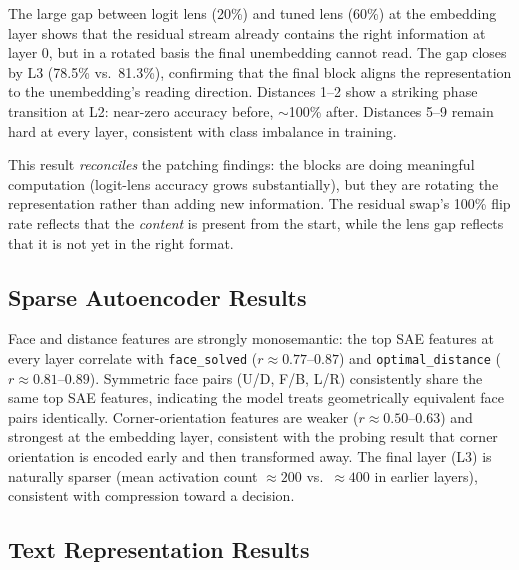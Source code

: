 \documentclass[12pt]{article}
\begin{document}
The large gap between logit lens (20\%) and tuned lens (60\%) at the embedding
layer shows that the residual stream already contains the right information at
layer 0, but in a rotated basis the final unembedding cannot read.  The gap
closes by L3 (78.5\% vs.\ 81.3\%), confirming that the final block aligns the
representation to the unembedding's reading direction.  Distances 1--2 show a
striking phase transition at L2: near-zero accuracy before, $\sim$100\% after.
Distances 5--9 remain hard at every layer, consistent with class imbalance in
training.

This result \emph{reconciles} the patching findings: the blocks are doing
meaningful computation (logit-lens accuracy grows substantially), but they are
rotating the representation rather than adding new information.  The residual
swap's 100\% flip rate reflects that the \emph{content} is present from the
start, while the lens gap reflects that it is not yet in the right format.

\subsection{Sparse Autoencoder Results}

Face and distance features are strongly monosemantic: the top SAE features at
every layer correlate with \texttt{face\_solved} ($r \approx 0.77$--$0.87$) and
\texttt{optimal\_distance} ($r \approx 0.81$--$0.89$).  Symmetric face pairs
(U/D, F/B, L/R) consistently share the same top SAE features, indicating the
model treats geometrically equivalent face pairs identically.  Corner-orientation
features are weaker ($r \approx 0.50$--$0.63$) and strongest at the embedding
layer, consistent with the probing result that corner orientation is encoded early
and then transformed away.  The final layer (L3) is naturally sparser (mean
activation count $\approx 200$ vs.\ $\approx 400$ in earlier layers), consistent
with compression toward a decision.

\subsection{Text Representation Results}
\end{document}
